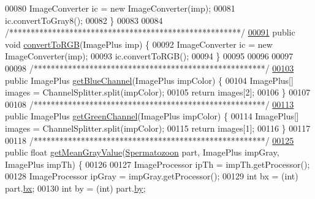 \begin{DoxyCode}
00080     ImageConverter ic = \textcolor{keyword}{new} ImageConverter(imp);
00081     ic.convertToGray8();
00082   \}
00083 
00084   \textcolor{comment}{/******************************************************/}
\hypertarget{_computer_vision_8java_source_l00091}{}\hyperlink{classfunctions_1_1_computer_vision_a98a9ec9a4b8c6a28678d649822a73bc8}{00091}   \textcolor{keyword}{public} \textcolor{keywordtype}{void} \hyperlink{classfunctions_1_1_computer_vision_a98a9ec9a4b8c6a28678d649822a73bc8}{convertToRGB}(ImagePlus imp) \{
00092     ImageConverter ic = \textcolor{keyword}{new} ImageConverter(imp);
00093     ic.convertToRGB();
00094   \}
00095 
00096 
00097 
00098   \textcolor{comment}{/******************************************************/}
\hypertarget{_computer_vision_8java_source_l00103}{}\hyperlink{classfunctions_1_1_computer_vision_a8569abc8aa379c890c8332eda42095be}{00103}   \textcolor{keyword}{public} ImagePlus \hyperlink{classfunctions_1_1_computer_vision_a8569abc8aa379c890c8332eda42095be}{getBlueChannel}(ImagePlus impColor) \{
00104     ImagePlus[] images = ChannelSplitter.split(impColor);
00105     \textcolor{keywordflow}{return} images[2];
00106   \}
00107 
00108   \textcolor{comment}{/******************************************************/}
\hypertarget{_computer_vision_8java_source_l00113}{}\hyperlink{classfunctions_1_1_computer_vision_a42b101d8bd6c2d64f663411074910dde}{00113}   \textcolor{keyword}{public}  ImagePlus \hyperlink{classfunctions_1_1_computer_vision_a42b101d8bd6c2d64f663411074910dde}{getGreenChannel}(ImagePlus impColor) \{
00114     ImagePlus[] images = ChannelSplitter.split(impColor);
00115     \textcolor{keywordflow}{return} images[1];
00116   \}
00117 
00118   \textcolor{comment}{/******************************************************/}
\hypertarget{_computer_vision_8java_source_l00125}{}\hyperlink{classfunctions_1_1_computer_vision_af9a3285b7e044506df25989c9f718308}{00125}   \textcolor{keyword}{public}  \textcolor{keywordtype}{float} \hyperlink{classfunctions_1_1_computer_vision_af9a3285b7e044506df25989c9f718308}{getMeanGrayValue}(\hyperlink{classdata_1_1_spermatozoon}{Spermatozoon} part, ImagePlus impGray, 
      ImagePlus impTh) \{
00126 
00127     ImageProcessor ipTh = impTh.getProcessor();
00128     ImageProcessor ipGray = impGray.getProcessor();
00129     \textcolor{keywordtype}{int} bx = (int) part.\hyperlink{classdata_1_1_spermatozoon_a5c25ae7634a79d11d6679b6b07c240a1}{bx};
00130     \textcolor{keywordtype}{int} by = (\textcolor{keywordtype}{int}) part.\hyperlink{classdata_1_1_spermatozoon_affce45e955f0a114a5569e019b8d8634}{by};

\end{DoxyCode}
